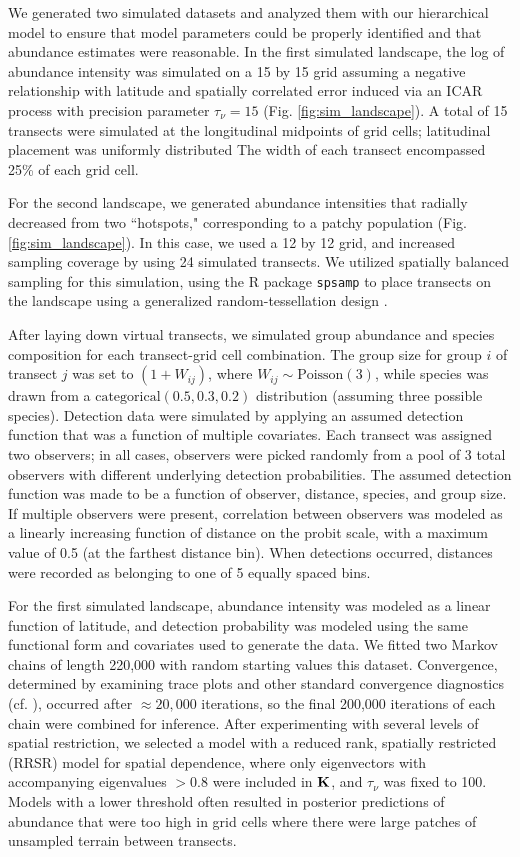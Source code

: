 \documentclass[10pt]{article}
\begin{document}
We generated two simulated datasets and analyzed them with our hierarchical model to ensure that model parameters could be properly identified and that abundance estimates were reasonable.  In the first simulated landscape, the log of abundance intensity was simulated on a 15 by 15 grid assuming a negative relationship with latitude and spatially correlated error induced via an ICAR process with precision parameter $\tau_\nu=15$ (Fig. \ref{fig:sim_landscape}).  A total of 15 transects were simulated at the longitudinal midpoints of grid cells; latitudinal placement was uniformly distributed   The width of each transect encompassed 25\% of each grid cell.

For the second landscape, we generated abundance intensities that radially decreased from two ``hotspots," corresponding to a patchy population (Fig. \ref{fig:sim_landscape}).  In this case, we used a 12 by 12 grid, and increased sampling coverage by using 24 simulated transects.  We utilized spatially balanced sampling for this simulation, using the R package {\tt spsamp} to place transects on the landscape using a generalized random-tessellation design \cite{StevensOlsen2004}.

After laying down virtual transects, we simulated group abundance and species composition for each transect-grid cell combination.  The group size for group $i$ of transect $j$ was set to $(1+W_{ij})$, where $W_{ij} \sim \textrm{Poisson}(3)$, while species was drawn from a $\textrm{categorical}(0.5,0.3,0.2)$ distribution (assuming three possible species).
Detection data were simulated by applying an assumed detection function that was a function of multiple covariates.  Each transect was assigned two observers; in all cases, observers were picked randomly from a pool of 3 total observers with different underlying detection probabilities.  The assumed detection function was made to be a function of observer, distance, species, and group size.  If multiple observers were present, correlation between observers was modeled as a linearly increasing function of distance on the probit scale, with a maximum value of 0.5 (at the farthest distance bin).  When detections occurred, distances were recorded as belonging to one of 5 equally spaced bins.

For the first simulated landscape, abundance intensity was modeled as a linear function of latitude, and detection probability was modeled using the same functional form and covariates used to generate the data. We fitted two Markov chains of length 220,000 with random starting values this dataset.  Convergence, determined by examining trace plots and other standard convergence diagnostics (cf. \cite{GelmanEtAl2004}), occurred after $\approx 20,000$ iterations, so the final 200,000 iterations of each chain were combined for inference.  After experimenting with several levels of spatial restriction, we selected a model with a reduced rank, spatially restricted (RRSR) model for spatial dependence, where only eigenvectors with accompanying eigenvalues $> 0.8$ were included in ${\bf K}$, and $\tau_\nu$ was fixed to 100.  Models with a lower threshold often resulted in posterior predictions of abundance that were too high in grid cells where there were large patches of unsampled terrain between transects.
\end{document}
